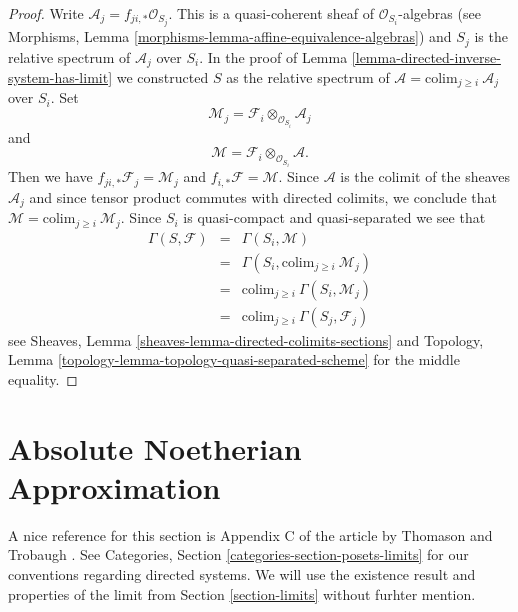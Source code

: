 \begin{proof}
Write $\mathcal{A}_j = f_{ji, *} \mathcal{O}_{S_j}$.
This is a quasi-coherent sheaf of $\mathcal{O}_{S_i}$-algebras
(see Morphisms, Lemma \ref{morphisms-lemma-affine-equivalence-algebras})
and $S_j$ is the relative spectrum of $\mathcal{A}_j$ over $S_i$.
In the proof of Lemma \ref{lemma-directed-inverse-system-has-limit}
we constructed $S$ as the relative spectrum of
$\mathcal{A} = \text{colim}_{j \geq i}\ \mathcal{A}_j$
over $S_i$. Set
$$
\mathcal{M}_j = \mathcal{F}_i \otimes_{\mathcal{O}_{S_i}} \mathcal{A}_j
$$
and
$$
\mathcal{M} = \mathcal{F}_i \otimes_{\mathcal{O}_{S_i}} \mathcal{A}.
$$
Then we have $f_{ji, *} \mathcal{F}_j = \mathcal{M}_j$
and $f_{i, *}\mathcal{F} = \mathcal{M}$. Since $\mathcal{A}$
is the colimit of the sheaves $\mathcal{A}_j$ and since tensor
product commutes with directed colimits, we conclude that
$\mathcal{M} = \text{colim}_{j \geq i}\ \mathcal{M}_j$.
Since $S_i$ is quasi-compact and quasi-separated we see that
\begin{eqnarray*}
\Gamma(S, \mathcal{F})
& = &
\Gamma(S_i, \mathcal{M}) \\
& = &
\Gamma(S_i, \text{colim}_{j \geq i} \ \mathcal{M}_j) \\
& = &
\text{colim}_{j \geq i}\ \Gamma(S_i, \mathcal{M}_j) \\
& = &
\text{colim}_{j \geq i}\ \Gamma(S_j, \mathcal{F}_j)
\end{eqnarray*}
see Sheaves, Lemma \ref{sheaves-lemma-directed-colimits-sections} and
Topology, Lemma \ref{topology-lemma-topology-quasi-separated-scheme}
for the middle equality.
\end{proof}















\section{Absolute Noetherian Approximation}
\label{section-approximation}

\noindent
A nice reference for this section is Appendix C of the article
by Thomason and Trobaugh \cite{TT}.
See Categories, Section \ref{categories-section-posets-limits}
for our conventions regarding directed systems.
We will use the existence result and properties of the limit
from Section \ref{section-limits} without furhter mention.


